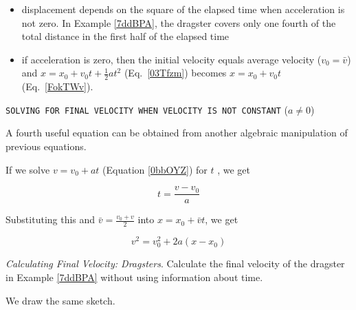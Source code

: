 \documentclass[dvipsnames]{article}
\def\xydirection{
        \begin{axis}[width=2.4cm,
            height=2.4cm,
            ticks=none,
            axis lines=center,
            ylabel=$y$,
            xlabel=$x$
        ]
        \end{axis}
}
\begin{document}
\begin{itemize}
    \item displacement depends on the square of the elapsed time when acceleration is not zero. In Example \ref{7ddBPA}, the dragster covers only one fourth of the total distance in the first half of the elapsed time
    \item if acceleration is zero, then the initial velocity equals average velocity ($v_0 = \bar{v}$) and $x = x_0 + v_0 t + \frac{1}{2} a t^2$ (Eq.~\ref{03Tfzm}) becomes $x = x_0 + v_0 t$ (Eq.~\ref{FokTWv}).
\end{itemize}

\cyanhrule

\vspace{1em}

\texttt{SOLVING FOR FINAL VELOCITY WHEN VELOCITY IS NOT CONSTANT} ($a \neq 0 $)

\vspace{1em}

A fourth useful equation can be obtained from another algebraic manipulation of previous equations.

\vspace{1em}

If we solve $v = v_0 + a t$ (Equation \ref{0bbOYZ}) for $t$ , we get

\begin{equation*}
    t = \frac{v - v_0}{a} 
\end{equation*}

Substituting this and $\bar{v} = \frac{v_0 + v}{2}$ into $x = x_0 + \bar{v} t$, we get 

\begin{equation} \label{jIcda3}
    v^2 = v_0^2 + 2 a (x-x_0)
\end{equation}

\cyanhrule

\vspace{1em}

\begin{example}
    \textit{Calculating Final Velocity: Dragsters}. Calculate the final velocity of the dragster in Example \ref{7ddBPA} without using information about time.
\end{example}

\Solution We draw the same sketch.

\begin{center}
\end{center}
\end{document}

